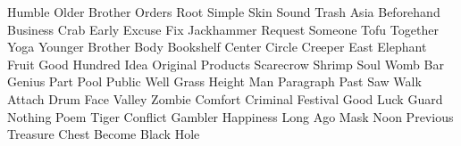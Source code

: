 \documentclass[letterpaper,frontgrid]{flacards}
\begin{document}
        {Humble}
        {Older Brother}
        {Orders}
        {Root}
        {Simple}
        {Skin}
        {Sound}
        {Trash}
        {Asia}
        {Beforehand}
        {Business}
        {Crab}
        {Early}
        {Excuse}
        {Fix}
        {Jackhammer}
        {Request}
        {Someone}
        {Tofu}
        {Together}
        {Yoga}
        {Younger Brother}
        {Body}
        {Bookshelf}
        {Center}
        {Circle}
        {Creeper}
        {East}
        {Elephant}
        {Fruit}
        {Good}
        {Hundred}
        {Idea}
        {Original}
        {Products}
        {Scarecrow}
        {Shrimp}
        {Soul}
        {Womb}
        {Bar}
        {Genius}
        {Part}
        {Pool}
        {Public}
        {Well}
        {Grass}
        {Height}
        {Man}
        {Paragraph}
        {Past}
        {Saw}
        {Walk}
        {Attach}
        {Drum}
        {Face}
        {Valley}
        {Zombie}
        {Comfort}
        {Criminal}
        {Festival}
        {Good Luck}
        {Guard}
        {Nothing}
        {Poem}
        {Tiger}
        {Conflict}
        {Gambler}
        {Happiness}
        {Long Ago}
        {Mask}
        {Noon}
        {Previous}
        {Treasure Chest}
        {Become}
        {Black Hole}
\end{document}
